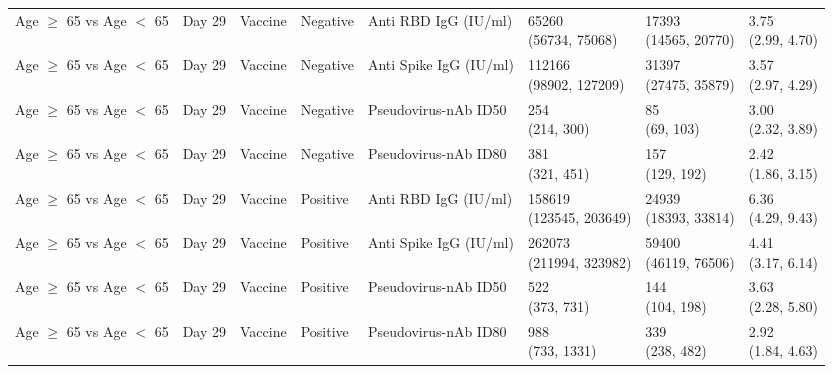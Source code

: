 \documentclass[]{book}
\theoremstyle{definition}
\theoremstyle{definition}
\theoremstyle{definition}
\newcommand{\1}{\mathbbm{1}}
\begin{document}
\begin{landscape}
\begin{ThreePartTable}
\begin{longtable}[t]{>{\raggedright\arraybackslash}p{2.7cm}lllllll}
Age $\geq$ 65 vs Age $<$ 65 & Day 29 & Vaccine & Negative & Anti RBD IgG (IU/ml) & \makecell[l]{65260\\(56734, 75068)} & \makecell[l]{17393\\(14565, 20770)} & \makecell[l]{3.75\\(2.99, 4.70)}\\
Age $\geq$ 65 vs Age $<$ 65 & Day 29 & Vaccine & Negative & Anti Spike IgG (IU/ml) & \makecell[l]{112166\\(98902, 127209)} & \makecell[l]{31397\\(27475, 35879)} & \makecell[l]{3.57\\(2.97, 4.29)}\\
Age $\geq$ 65 vs Age $<$ 65 & Day 29 & Vaccine & Negative & Pseudovirus-nAb ID50 & \makecell[l]{254\\(214, 300)} & \makecell[l]{85\\(69, 103)} & \makecell[l]{3.00\\(2.32, 3.89)}\\
Age $\geq$ 65 vs Age $<$ 65 & Day 29 & Vaccine & Negative & Pseudovirus-nAb ID80 & \makecell[l]{381\\(321, 451)} & \makecell[l]{157\\(129, 192)} & \makecell[l]{2.42\\(1.86, 3.15)}\\
\addlinespace
Age $\geq$ 65 vs Age $<$ 65 & Day 29 & Vaccine & Positive & Anti RBD IgG (IU/ml) & \makecell[l]{158619\\(123545, 203649)} & \makecell[l]{24939\\(18393, 33814)} & \makecell[l]{6.36\\(4.29, 9.43)}\\
Age $\geq$ 65 vs Age $<$ 65 & Day 29 & Vaccine & Positive & Anti Spike IgG (IU/ml) & \makecell[l]{262073\\(211994, 323982)} & \makecell[l]{59400\\(46119, 76506)} & \makecell[l]{4.41\\(3.17, 6.14)}\\
Age $\geq$ 65 vs Age $<$ 65 & Day 29 & Vaccine & Positive & Pseudovirus-nAb ID50 & \makecell[l]{522\\(373, 731)} & \makecell[l]{144\\(104, 198)} & \makecell[l]{3.63\\(2.28, 5.80)}\\
Age $\geq$ 65 vs Age $<$ 65 & Day 29 & Vaccine & Positive & Pseudovirus-nAb ID80 & \makecell[l]{988\\(733, 1331)} & \makecell[l]{339\\(238, 482)} & \makecell[l]{2.92\\(1.84, 4.63)}\\

\end{longtable}
\end{ThreePartTable}
\end{landscape}
\end{document}

